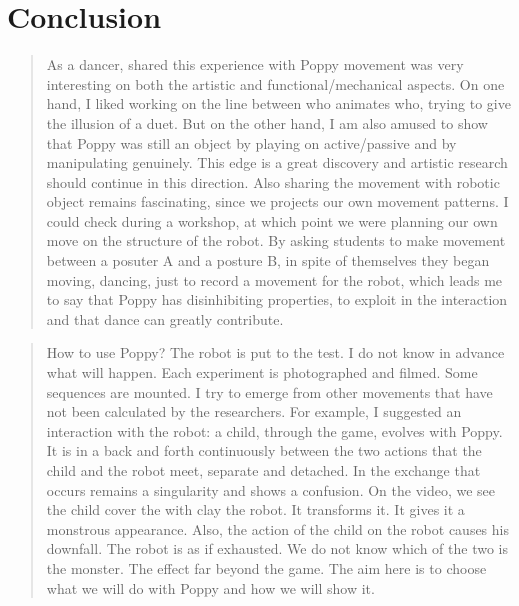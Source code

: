 \section{Conclusion} %

\begin{quotation}
    As a dancer, shared this experience with Poppy movement was very interesting on both the artistic and functional/mechanical aspects. On one hand, I liked working on the line between who animates who, trying to give the illusion of a duet. But on the other hand, I am also amused to show that Poppy was still an object by playing on active/passive and by manipulating genuinely. This edge is a great discovery and artistic research should continue in this direction.
    Also sharing the movement with robotic object remains fascinating, since we projects our own movement patterns. I could check during a workshop, at which point we were planning our own move on the structure of the robot. By asking students to make movement between a posuter A and a posture B, in spite of themselves they began moving, dancing, just to record a movement for the robot, which leads me to say that Poppy has disinhibiting properties, to exploit in the interaction and that dance can greatly contribute.

\end{quotation}


\begin{quotation}
    How to use Poppy? The robot is put to the test. I do not know in advance what will happen. Each experiment is photographed and filmed. Some sequences are mounted. I try to emerge from other movements that have not been calculated by the researchers. For example, I suggested an interaction with the robot: a child, through the game, evolves with Poppy. It is in a back and forth continuously between the two actions that the child and the robot meet, separate and detached. In the exchange that occurs remains a singularity and shows a confusion. On the video, we see the child cover the with clay the robot. It transforms it. It gives it a monstrous appearance. Also, the action of the child on the robot causes his downfall. The robot is as if exhausted. We do not know which of the two is the monster. The effect far beyond the game. The aim here is to choose what we will do with Poppy and how we will show it.
\end{quotation}


